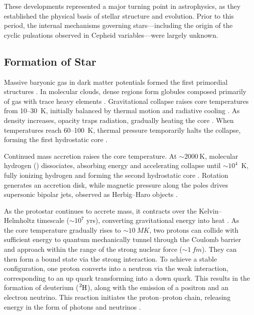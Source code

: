 These developments represented a major turning point in astrophysics, as they established the physical basis of stellar structure and evolution. Prior to this period, the internal mechanisms governing stars---including the origin of the cyclic pulsations observed in Cepheid variables---were largely unknown.


\subsection{Formation of Star}
Massive baryonic gas in dark matter potentials formed the first primordial structures \citep{Abel1997}. In molecular clouds, dense regions form globules composed primarily of  gas with trace heavy elements \citep{Krause2020}. Gravitational collapse raises core temperatures from 10--30~K, initially balanced by thermal motion and radiative cooling \citep{Masunaga1999}. As density increases, opacity traps radiation, gradually heating the core \citep{Bate2014}. When temperatures reach 60--100~K, thermal pressure temporarily halts the collapse, forming the first hydrostatic core \citep{Larson1969}. 

Continued mass accretion raises the core temperature. At $\sim \SI{2000}{\kelvin}$, molecular hydrogen () dissociates, absorbing energy and accelerating collapse until $\sim 10^{4}$~K, fully ionizing hydrogen and forming the second hydrostatic core \citep{Larson1969, Masunaga1999, Bate2014}. Rotation generates an accretion disk, while magnetic pressure along the poles drives supersonic bipolar jets, observed as Herbig--Haro objects \citep{Reipurth2001}.

As the protostar continues to accrete mass, it contracts over the Kelvin--Helmholtz timescale ($\sim 10^7$ yrs), converting gravitational energy into heat \citep{Kippenhahn2012, Stahler2004}. As the core temperature gradually rises to $\sim \SI{10}{MK}$, two protons can collide with sufficient energy to quantum mechanically tunnel through the Coulomb barrier and approach within the range of the strong nuclear force ($\sim \SI{1}{fm}$). They can then form a bound state via the strong interaction. To achieve a stable configuration, one proton converts into a neutron via the weak interaction, corresponding to an up quark transforming into a down quark. This results in the formation of deuterium ($\ce{^2H}$), along with the emission of a positron and an electron neutrino. This reaction initiates the proton--proton chain, releasing energy in the form of photons and neutrinos \citep{Bahcall1989}.

